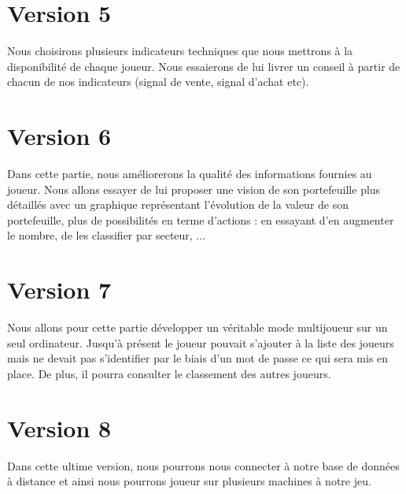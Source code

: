 \section{Version 5}
Nous choisirons plusieurs indicateurs techniques que nous mettrons à la disponibilité de chaque joueur. Nous essaierons de lui livrer un conseil à partir de chacun de nos indicateurs (signal de vente, signal d'achat etc). 

\section{Version 6}
Dans cette partie, nous améliorerons la qualité des informations fournies au joueur. Nous  
allons essayer de lui proposer une vision de son portefeuille plus détaillés avec un graphique représentant l'évolution de la valeur de son portefeuille, plus de possibilités en terme d'actions : en essayant d'en augmenter le nombre, de les classifier par secteur, ...


\section{Version 7}
Nous allons pour cette partie développer un véritable mode multijoueur sur un seul ordinateur. Jusqu'à présent le joueur pouvait s'ajouter à la liste des joueurs mais ne devait pas s'identifier par le biais d'un mot de passe ce qui sera mis en place. De plus, il pourra consulter le classement des autres joueurs. 

\section{Version 8}
Dans cette ultime version, nous pourrons nous connecter à notre base de données à distance et ainsi nous pourrons joueur sur plusieurs machines à notre jeu. 